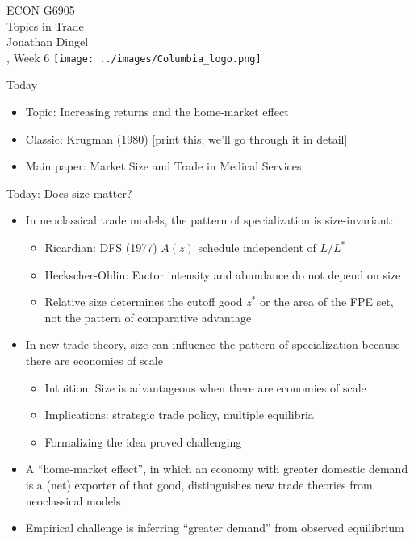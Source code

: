 \documentclass[11pt,notes=hide,aspectratio=169]{beamer}
\begin{document}
\begin{frame}[plain]
\begin{center}
\large
\textcolor{columbiadarkblue}{ECON G6905\\
Topics in Trade\\ 
Jonathan Dingel\\
\semester, Week 6}
\vfill 
\texttt{[image: ../images/Columbia\_logo.png]}
\end{center}
\end{frame}
\begin{frame}{Today}
\begin{itemize}
	\item Topic: Increasing returns and the home-market effect
	\item Classic: Krugman (1980) [print this; we'll go through it in detail]
	\item Main paper: Market Size and Trade in Medical Services
\end{itemize}
\end{frame}
\begin{frame}{Today: Does size matter?}
\linespread{1.1}
\begin{itemize}
	\item In neoclassical trade models, the pattern of specialization is size-invariant:
	\begin{itemize}
		\item Ricardian: DFS (1977) $A(z)$ schedule independent of $L/L^{*}$
		\item Heckscher-Ohlin: Factor intensity and abundance do not depend on size 
		\item Relative size determines the cutoff good $z^{*}$ or the area of the FPE set, not the pattern of comparative advantage
	\end{itemize}
	\item In new trade theory, size can influence the pattern of specialization because there are economies of scale
\begin{itemize}
	\item Intuition: Size is advantageous when there are economies of scale
	\item Implications: strategic trade policy, multiple equilibria
	\item Formalizing the idea proved challenging
\end{itemize}
	\item A ``home-market effect'', in which an economy with greater domestic demand is a (net) exporter of that good, distinguishes new trade theories from neoclassical models
	\item Empirical challenge is inferring ``greater demand'' from observed equilibrium
\end{itemize}
\end{frame}
\end{document}
